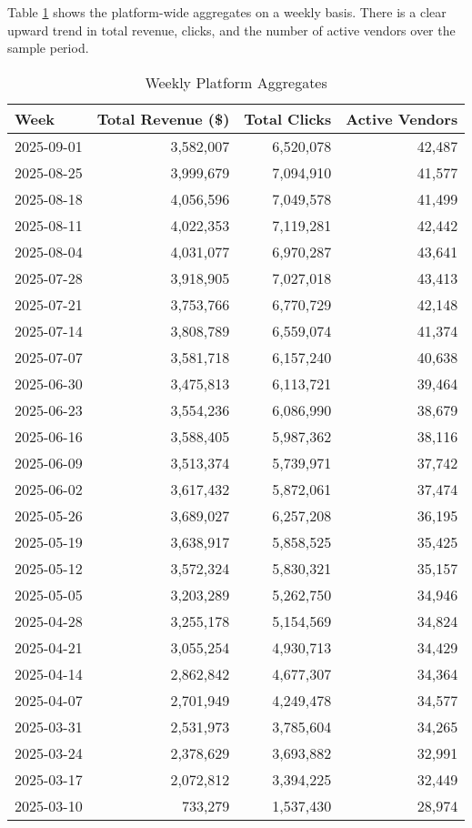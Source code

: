 Table \ref{tab:weekly_agg} shows the platform-wide aggregates on a weekly basis. There is a clear upward trend in total revenue, clicks, and the number of active vendors over the sample period.

\begin{table}[htbp!]
\centering
\caption{Weekly Platform Aggregates}
\label{tab:weekly_agg}
\begin{tabular}{lrrr}
\toprule
Week & Total Revenue (\$) & Total Clicks & Active Vendors \\
\midrule
2025-09-01 & 3,582,007 & 6,520,078 & 42,487 \\
2025-08-25 & 3,999,679 & 7,094,910 & 41,577 \\
2025-08-18 & 4,056,596 & 7,049,578 & 41,499 \\
2025-08-11 & 4,022,353 & 7,119,281 & 42,442 \\
2025-08-04 & 4,031,077 & 6,970,287 & 43,641 \\
2025-07-28 & 3,918,905 & 7,027,018 & 43,413 \\
2025-07-21 & 3,753,766 & 6,770,729 & 42,148 \\
2025-07-14 & 3,808,789 & 6,559,074 & 41,374 \\
2025-07-07 & 3,581,718 & 6,157,240 & 40,638 \\
2025-06-30 & 3,475,813 & 6,113,721 & 39,464 \\
2025-06-23 & 3,554,236 & 6,086,990 & 38,679 \\
2025-06-16 & 3,588,405 & 5,987,362 & 38,116 \\
2025-06-09 & 3,513,374 & 5,739,971 & 37,742 \\
2025-06-02 & 3,617,432 & 5,872,061 & 37,474 \\
2025-05-26 & 3,689,027 & 6,257,208 & 36,195 \\
2025-05-19 & 3,638,917 & 5,858,525 & 35,425 \\
2025-05-12 & 3,572,324 & 5,830,321 & 35,157 \\
2025-05-05 & 3,203,289 & 5,262,750 & 34,946 \\
2025-04-28 & 3,255,178 & 5,154,569 & 34,824 \\
2025-04-21 & 3,055,254 & 4,930,713 & 34,429 \\
2025-04-14 & 2,862,842 & 4,677,307 & 34,364 \\
2025-04-07 & 2,701,949 & 4,249,478 & 34,577 \\
2025-03-31 & 2,531,973 & 3,785,604 & 34,265 \\
2025-03-24 & 2,378,629 & 3,693,882 & 32,991 \\
2025-03-17 & 2,072,812 & 3,394,225 & 32,449 \\
2025-03-10 & 733,279 & 1,537,430 & 28,974 \\
\bottomrule
\end{tabular}
\end{table}


